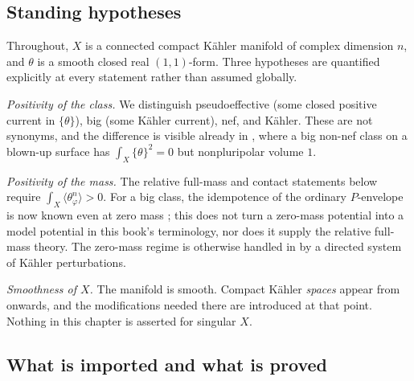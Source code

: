 \subsection{Standing hypotheses}
\label{sec:ch51-hypotheses}

Throughout, \(X\) is a connected compact K\"ahler manifold of complex
dimension \(n\), and \(\theta\) is a smooth closed real \((1,1)\)-form.
Three hypotheses are quantified explicitly at every statement rather than
assumed globally.

\emph{Positivity of the class.}  We distinguish pseudoeffective (some
closed positive current in \(\{\theta\}\)), big (some K\"ahler current),
nef, and K\"ahler.  These are not synonyms, and the difference is visible
already in , where a big non-nef class on a
blown-up surface has \(\int_X\{\theta\}^2=0\) but nonpluripolar volume
\(1\).

\emph{Positivity of the mass.}  The relative full-mass and contact
statements below require \(\int_X\langle\theta_\varphi^n\rangle>0\).
For a big class, the idempotence of the ordinary \(P\)-envelope is now
known even at zero mass \cite[Theorem~1.2]{PSWZ26}; this does not turn a
zero-mass potential into a model potential in this book's terminology, nor
does it supply the relative full-mass theory.  The zero-mass regime is
otherwise handled in  by a directed
system of K\"ahler perturbations.

\emph{Smoothness of \(X\).}  The manifold is smooth.  Compact K\"ahler
\emph{spaces} appear from  onwards, and
the modifications needed there are introduced at that point.  Nothing in
this chapter is asserted for singular \(X\).

\subsection{What is imported and what is proved}
\label{sec:ch51-imported}

